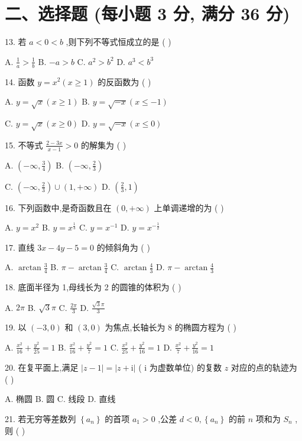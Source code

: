 \documentclass[10pt]{article}
\begin{document}
\section*{二、选择题 (每小题 3 分, 满分 36 分)}

13. 若 \(a < 0 < b\) ,则下列不等式恒成立的是 ( )

A. \(\frac{1}{a} > \frac{1}{b}\) B. \(- a > b\) C. \({a}^{2} > {b}^{2}\) D. \({a}^{3} < {b}^{3}\)

14. 函数 \(y = {x}^{2}\left( {x \geq  1}\right)\) 的反函数为 ( )

A. \(y = \sqrt{x}\left( {x \geq  1}\right)\) B. \(y = \sqrt{-x}\left( {x \leq   - 1}\right)\)

C. \(y = \sqrt{x}\left( {x \geq  0}\right)\) D. \(y = \sqrt{-x}\left( {x \leq  0}\right)\)

15. 不等式 \(\frac{2 - {3x}}{x - 1} > 0\) 的解集为 ( )

A. \(\left( {-\infty ,\frac{3}{4}}\right)\) B. \(\left( {-\infty ,\frac{2}{3}}\right)\)

C. \(\left( {-\infty ,\frac{2}{3}}\right)  \cup  \left( {1, + \infty }\right)\) D. \(\left( {\frac{2}{3},1}\right)\)

16. 下列函数中,是奇函数且在 \(\left( {0, + \infty }\right)\) 上单调递增的为 ( )

A. \(y = {x}^{2}\) B. \(y = {x}^{\frac{1}{3}}\) C. \(y = {x}^{-1}\) D. \(y = {x}^{-\frac{1}{2}}\)

17. 直线 \({3x} - {4y} - 5 = 0\) 的倾斜角为 ( )

A. \(\arctan \frac{3}{4}\) B. \(\pi  - \arctan \frac{3}{4}\) C. \(\arctan \frac{4}{3}\) D. \(\pi  - \arctan \frac{4}{3}\)

18. 底面半径为 1,母线长为 2 的圆锥的体积为 ( )

A. \({2\pi }\) B. \(\sqrt{3}\pi\) C. \(\frac{2\pi }{3}\) D. \(\frac{\sqrt{3}\pi }{3}\)

19. 以 \(\left( {-3,0}\right)\) 和 \(\left( {3,0}\right)\) 为焦点,长轴长为 8 的椭圆方程为 ( )

A. \(\frac{{x}^{2}}{16} + \frac{{y}^{2}}{25} = 1\) B. \(\frac{{x}^{2}}{16} + \frac{{y}^{2}}{7} = 1\) C. \(\frac{{x}^{2}}{25} + \frac{{y}^{2}}{16} = 1\) D. \(\frac{{x}^{2}}{7} + \frac{{y}^{2}}{16} = 1\)

20. 在复平面上,满足 \(\left| {z - 1}\right|  = \left| {z + \mathrm{i}}\right|\) ( \(\mathrm{i}\) 为虚数单位) 的复数 \(z\) 对应的点的轨迹为 ( )

A. 椭圆 B. 圆 C. 线段 D. 直线

21. 若无穷等差数列 \(\left\{  {a}_{n}\right\}\) 的首项 \({a}_{1} > 0\) ,公差 \(d < 0,\left\{  {a}_{n}\right\}\) 的前 \(n\) 项和为 \({S}_{n}\) ,则 ( )
\end{document}
